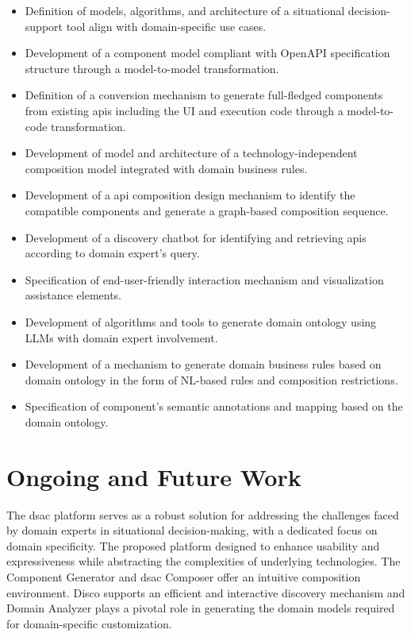 \begin{itemize}
\item
  Definition of models, algorithms, and architecture of a situational
  decision-support tool align with domain-specific use cases.
\item
  Development of a component model compliant with OpenAPI specification
  structure through a model-to-model transformation.
\item
  Definition of a conversion mechanism to generate full-fledged
  components from existing \gls{api}s including the UI and execution code
  through a model-to-code transformation.
\item
  Development of model and architecture of a ﻿technology-independent
  composition model integrated with domain business rules.
\item
  Development of a \gls{api} composition design mechanism to identify the
  compatible components and generate a graph-based composition sequence.
\item
  Development of a discovery chatbot for identifying and retrieving \gls{api}s
  according to domain expert's query.
\item
  Specification of end-user-friendly interaction mechanism and
  visualization assistance elements.
\item
  Development of algorithms and tools to generate domain ontology using
  LLMs with domain expert involvement.
\item
  Development of a mechanism to generate domain business rules based on
  domain ontology in the form of NL-based rules and composition
  restrictions.
\item
  Specification of component's semantic annotations and mapping based on
  the domain ontology.
\end{itemize}


\vspace{-15pt}
\hypertarget{ongoing-and-future-work}{%
\section{Ongoing and Future Work}\label{ongoing-and-future-work}}
\vspace{15pt}

The \gls{dsac} platform serves as a robust solution for addressing the challenges faced by domain experts in situational decision-making, with a dedicated focus on domain specificity. The proposed platform designed to enhance usability and expressiveness while abstracting the complexities of underlying technologies. The Component Generator and \gls{dsac} Composer offer an intuitive composition environment. Disco supports an efficient and interactive discovery mechanism and Domain Analyzer plays a pivotal role in generating the domain models required for domain-specific customization. 

